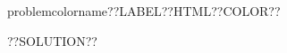 \renewcommand\problemlabel{??LABEL??}
\renewcommand\problemcolor{??COLOR??}
\renewcommand\problemtitle{??TITLE??}
\renewcommand\problemauthor{??AUTHOR??}
\renewcommand\problempreparation{??PREPARATION??}

\renewcommand\problemcolorname{problemcolorname\problemlabel}
\definecolor\problemcolorname{HTML}{\problemcolor}

\pagestyle{solution}

\solutionheader

??SOLUTION??

